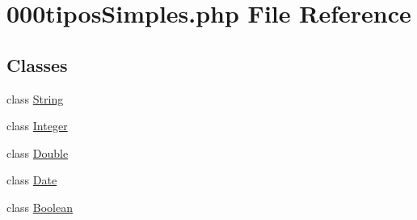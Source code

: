 \hypertarget{000tipos_simples_8php}{
\section{000tiposSimples.php File Reference}
\label{000tipos_simples_8php}
}
\subsection*{Classes}
\begin{CompactItemize}
\item 
class \hyperlink{class_string}{String}
\item 
class \hyperlink{class_integer}{Integer}
\item 
class \hyperlink{class_double}{Double}
\item 
class \hyperlink{class_date}{Date}
\item 
class \hyperlink{class_boolean}{Boolean}
\end{CompactItemize}
